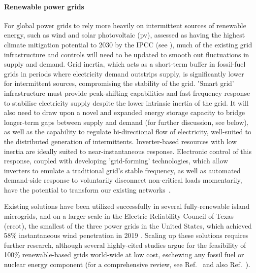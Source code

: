 \documentclass[../SustainableHEP.tex]{subfiles}
\begin{document}
\paragraph{Renewable power grids}

For global power grids to rely more heavily on intermittent sources of renewable energy, such as wind and solar photovoltaic (\acrshort{pv}), assessed as having the highest climate mitigation potential to 2030 by the IPCC (see ), much of the existing grid infrastructure and controls will need to be updated to smooth out fluctuations in supply and demand.  Grid inertia, which acts as a short-term buffer in fossil-fuel grids in periods where electricity demand outstrips supply, is significantly lower for intermittent sources, compromising the stability of the grid. 'Smart grid' infrastructure must provide peak-shifting capabilities and fast frequency response to stabilise electricity supply despite the lower intrinsic inertia of the grid.  It will also need to draw upon a novel and expanded energy storage capacity to bridge longer-term gaps between supply and demand (for further discussion, see below), as well as the capability to regulate bi-directional flow of electricity, well-suited to the distributed generation of intermittents.  Inverter-based resources with low inertia are ideally suited to near-instantaneous response.  Electronic control of this response, coupled with developing 'grid-forming' technologies, which allow inverters to emulate a traditional grid's stable frequency, as well as automated demand-side response to voluntarily disconnect non-critical loads momentarily, have the potential to transform our existing networks~\cite{PowerGridInertia}.  

Existing solutions have been utilized successfully in several fully-renewable island microgrids, and on a larger scale in the Electric Reliability Council of Texas (\acrshort{ercot}), the smallest of the three power grids in the United States, which achieved 58\% instantaneous wind penetration in 2019 \cite{PowerGridInertia}.  Scaling up these solutions requires further research, although several highly-cited studies argue for the feasibility of 100\% renewable-based grids world-wide at low cost, eschewing any fossil fuel or nuclear energy component (for a comprehensive review, see Ref.~\cite{HEARD20171122} and also Ref.~\cite{BROWN2018834}).  
\end{document}
